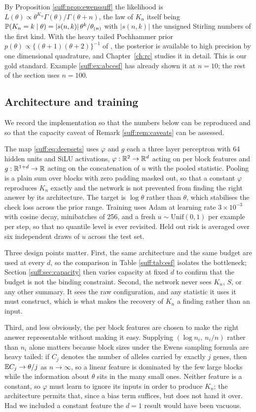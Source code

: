 By Proposition \ref{suff:prop:ewenssuff} the likelihood is
$L(\theta)\propto\theta^{K_n}\Gamma(\theta)/\Gamma(\theta+n)$, the law of $K_n$ itself being
$\mathbb{P}(K_n=k\mid\theta)=|s(n,k)|\,\theta^k/\theta_{(n)}$ with $|s(n,k)|$ the unsigned Stirling
numbers of the first kind. With the heavy tailed Pochhammer prior
$p(\theta)\propto\{(\theta+1)(\theta+2)\}^{-1}$ of \citet{suff:wangpolson2024}, the posterior
is available to high precision by one dimensional quadrature, and Chapter~\ref{ch:rc} studies
it in detail. This is our gold standard. Example \ref{suff:ex:abcesf} has already shown it at
$n=10$; the rest of the section uses $n=100$.

\subsection{Architecture and training}
\label{suff:sec:arch}

We record the implementation so that the numbers below can be reproduced and so that the
capacity caveat of Remark \ref{suff:rem:caveats} can be assessed.

The map \eqref{suff:eq:deepsets} uses $\varphi$ and $g$ each a three layer perceptron with 64
hidden units and SiLU activations, $\varphi:\mathbb{R}^2\to\mathbb{R}^d$ acting on per block features and
$g:\mathbb{R}^{1+d}\to\mathbb{R}$ acting on the concatenation of $u$ with the pooled statistic. Pooling is a
plain sum over blocks with zero padding masked out, so that a constant $\varphi$ reproduces
$K_n$ exactly and the network is not prevented from finding the right answer by its
architecture. The target is $\log\theta$ rather than $\theta$, which stabilises the check
loss across the prior range. Training uses Adam at learning rate $3\times10^{-3}$ with cosine
decay, minibatches of 256, and a fresh $u\sim\mathrm{Unif}(0,1)$ per example per step, so
that no quantile level is ever revisited. Held out risk is averaged over six independent
draws of $u$ across the test set.

Three design points matter. First, the same architecture and the same budget are used at
every $d$, so the comparison in Table \ref{suff:tab:esf} isolates the bottleneck; Section
\ref{suff:sec:capacity} then varies capacity at fixed $d$ to confirm that the budget is not the
binding constraint. Second, the network never sees $K_n$, $S$, or any other summary. It sees
the raw configuration, and any statistic it uses it must construct, which is what makes the
recovery of $K_n$ a finding rather than an input.

Third, and less obviously, the per block features are chosen to make the right answer
representable without making it easy. Supplying $(\log n_i,\ n_i/n)$ rather than $n_i$ alone
matters because block sizes under the Ewens sampling formula are heavy tailed: if $C_j$
denotes the number of alleles carried by exactly $j$ genes, then $\mathbb{E} C_j\to\theta/j$ as
$n\to\infty$, so a linear feature is dominated by the few large blocks while the information
about $\theta$ sits in the many small ones. Neither feature is a constant, so $\varphi$ must
learn to ignore its inputs in order to produce $K_n$; the architecture permits that, since a
bias term suffices, but does not hand it over. Had we included a constant feature the $d=1$
result would have been vacuous.

